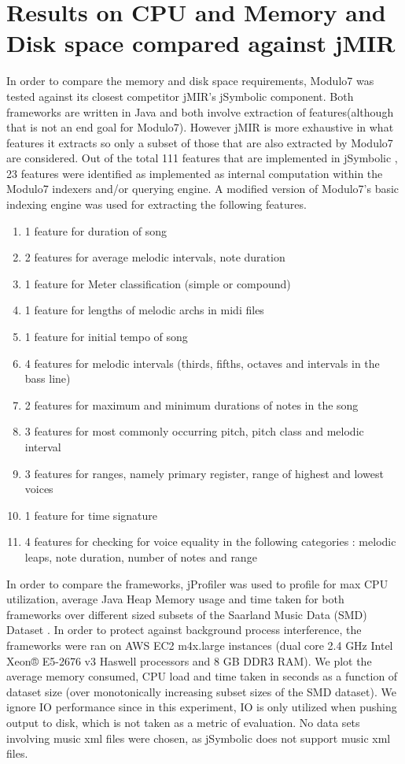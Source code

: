\section{Results on CPU and Memory and Disk space compared against jMIR} \label{vsjmir}

\noindent In order to compare the memory and disk space requirements, Modulo7 was tested against its closest competitor jMIR's \cite{jMIR} jSymbolic component. Both frameworks are written in Java and both involve extraction of features(although that is not an end goal for Modulo7). However jMIR is more exhaustive in what features it extracts so only a subset of those that are also extracted by Modulo7 are considered. Out of the total 111 features that are implemented in jSymbolic \cite{jSymbolic}, 23 features were identified as implemented as internal computation within the Modulo7 indexers and/or querying engine. A modified version of Modulo7's basic indexing engine was used for extracting the following features. 
\begin{enumerate}
\item 1 feature for duration of song
\item 2 features for average melodic intervals, note duration
\item 1 feature for Meter classification (simple or compound)
\item 1 feature for lengths of melodic archs in midi files
\item 1 feature for initial tempo of song
\item 4 features for melodic intervals (thirds, fifths, octaves and intervals in the bass line)
\item 2 features for maximum and minimum durations of notes in the song
\item 3 features for most commonly occurring pitch, pitch class and melodic interval
\item 3 features for ranges, namely primary register, range of highest and lowest voices
\item 1 feature for time signature
\item 4 features for checking for voice equality in the following categories : melodic leaps, note duration, number of notes and range \\
\end{enumerate}
\noindent In order to compare the frameworks, jProfiler was used to profile for max CPU utilization, average Java Heap Memory usage and time taken for both frameworks over different sized subsets of the Saarland Music Data (SMD) Dataset \cite{saarlandmsd}. In order to protect against background process interference, the frameworks were ran on AWS EC2 m4x.large instances (dual core 2.4 GHz Intel Xeon® E5-2676 v3 Haswell processors and 8 GB DDR3 RAM). We plot the average memory consumed, CPU load and time taken in seconds as a function of dataset size (over monotonically increasing subset sizes of the SMD dataset). We ignore IO performance since in this experiment, IO is only utilized when pushing output to disk, which is not taken as a metric of evaluation. No data sets involving music xml files were chosen, as jSymbolic does not support music xml files.\\ 

